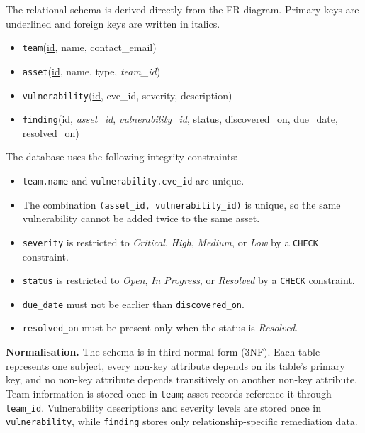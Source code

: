 \documentclass[11pt,a4paper]{article}
\begin{document}
The relational schema is derived directly from the ER diagram. Primary keys are
underlined and foreign keys are written in italics.

\begin{itemize}
  \item \texttt{team}(\underline{id}, name, contact\_email)
  \item \texttt{asset}(\underline{id}, name, type, \emph{team\_id})
  \item \texttt{vulnerability}(\underline{id}, cve\_id, severity, description)
  \item \texttt{finding}(\underline{id}, \emph{asset\_id},
        \emph{vulnerability\_id}, status, discovered\_on, due\_date,
        resolved\_on)
\end{itemize}

The database uses the following integrity constraints:

\begin{itemize}
  \item \texttt{team.name} and \texttt{vulnerability.cve\_id} are unique.
  \item The combination \texttt{(asset\_id, vulnerability\_id)} is unique, so
        the same vulnerability cannot be added twice to the same asset.
  \item \texttt{severity} is restricted to \emph{Critical}, \emph{High},
        \emph{Medium}, or \emph{Low} by a \texttt{CHECK} constraint.
  \item \texttt{status} is restricted to \emph{Open}, \emph{In Progress}, or
        \emph{Resolved} by a \texttt{CHECK} constraint.
  \item \texttt{due\_date} must not be earlier than \texttt{discovered\_on}.
  \item \texttt{resolved\_on} must be present only when the status is
        \emph{Resolved}.
\end{itemize}

\textbf{Normalisation.} The schema is in third normal form (3NF). Each table
represents one subject, every non-key attribute depends on its table's primary
key, and no non-key attribute depends transitively on another non-key attribute.
Team information is stored once in \texttt{team}; asset records reference it
through \texttt{team\_id}. Vulnerability descriptions and severity levels are
stored once in \texttt{vulnerability}, while \texttt{finding} stores only
relationship-specific remediation data.

\end{document}
